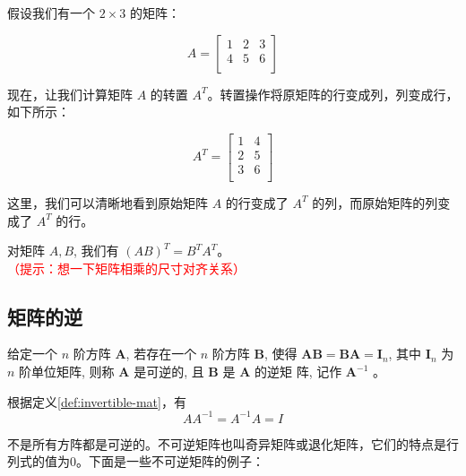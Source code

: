 \begin{exercise}
    假设我们有一个 $2 \times 3$ 的矩阵：

$$
A = \begin{bmatrix}
1 & 2 & 3 \\
4 & 5 & 6 \\
\end{bmatrix}
$$

现在，让我们计算矩阵 $A$ 的转置 $A^T$。转置操作将原矩阵的行变成列，列变成行，如下所示：

$$
A^T = \begin{bmatrix}
1 & 4 \\
2 & 5 \\
3 & 6 \\
\end{bmatrix}
$$

这里，我们可以清晰地看到原始矩阵 $A$ 的行变成了 $A^T$ 的列，而原始矩阵的列变成了 $A^T$ 的行。

\end{exercise}

\begin{theorem}[转置运算的性质] \label{thm:transpose-property}
    对矩阵 $A, B$, 我们有 $(A B)^T=B^T A^T$。\textcolor{red}{（提示：想一下矩阵相乘的尺寸对齐关系）}
\end{theorem}

\subsection{矩阵的逆}

\begin{definition} \label{def:invertible-mat}
    给定一个 $n$ 阶方阵 $\mathbf{A}$, 若存在一个 $n$ 阶方阵 $\mathbf{B}$, 使得 $\mathbf{A B}=\mathbf{B} \mathbf{A}=\mathbf{I}_n$, 其中 $\mathbf{I}_n$ 为 $n$ 阶单位矩阵, 则称 $\mathbf{A}$ 是可逆的, 且 $\mathbf{B}$ 是 $\mathbf{A}$ 的逆矩 阵, 记作 $\mathbf{A}^{-1}$ 。
\end{definition}

根据定义\ref{def:invertible-mat}，有
$$
A A^{-1}=A^{-1} A=I
$$

不是所有方阵都是可逆的。不可逆矩阵也叫奇异矩阵或退化矩阵，它们的特点是行列式的值为0。下面是一些不可逆矩阵的例子：

